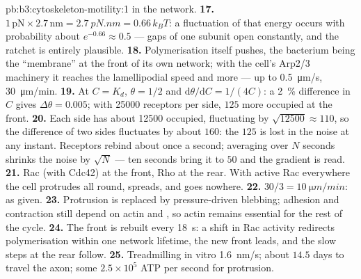 \begin{solution}{pb:b3:cytoskeleton-motility:1}
in the network.
\textbf{17.} $1\,\text{pN}\times 2.7\,\text{nm} = \qty{2.7}{pN.nm} =
0.66\,k_{B}T$: a fluctuation of that energy occurs with probability
about $e^{-0.66} \approx 0.5$ --- gaps of one subunit open constantly,
and the ratchet is entirely plausible.
\textbf{18.} Polymerisation itself pushes, the bacterium being the
``membrane'' at the front of its own network; with the cell's Arp2/3
machinery it reaches the lamellipodial speed and more --- up to
\qty{0.5}{\micro m/s}, \qty{30}{\micro m/min}.
\textbf{19.} At $C = K_{d}$, $\theta = 1/2$ and $\mathrm{d}\theta/
\mathrm{d}C = 1/(4C)$: a \qty{2}{\%} difference in $C$ gives $\Delta\theta
= 0.005$; with \num{25000} receptors per side, $125$ more occupied at
the front.
\textbf{20.} Each side has about \num{12500} occupied, fluctuating by
$\sqrt{\num{12500}} \approx 110$, so the difference of two sides
fluctuates by about $160$: the $125$ is lost in the noise at any
instant. Receptors rebind about once a second; averaging over $N$
seconds shrinks the noise by $\sqrt{N}$ --- ten seconds bring it to
$50$ and the gradient is read.
\textbf{21.} Rac (with Cdc42) at the front, Rho at the rear. With active
Rac everywhere the cell protrudes all round, spreads, and goes nowhere.
\textbf{22.} $30/3 = \qty{10}{\micro m/min}$: as given.
\textbf{23.} Protrusion is replaced by pressure-driven blebbing; adhesion
and contraction still depend on actin and , so actin remains
essential for the rest of the cycle.
\textbf{24.} The front is rebuilt every \qty{18}{s}: a shift in Rac
activity redirects polymerisation within one network lifetime, the new
front leads, and the slow steps at the rear follow.
\textbf{25.} Treadmilling in vitro \qty{1.6}{nm/s}; about $14.5$ days
to travel the axon; some $2.5\times 10^{5}$ ATP per second for
protrusion.
\end{solution}
